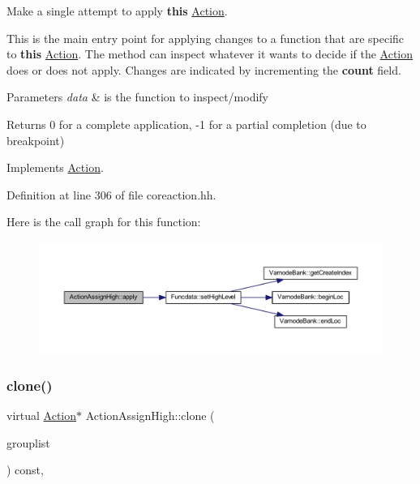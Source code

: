 Make a single attempt to apply {\bfseries{this}} \mbox{\hyperlink{class_action}{Action}}. 

This is the main entry point for applying changes to a function that are specific to {\bfseries{this}} \mbox{\hyperlink{class_action}{Action}}. The method can inspect whatever it wants to decide if the \mbox{\hyperlink{class_action}{Action}} does or does not apply. Changes are indicated by incrementing the {\bfseries{count}} field. 
\begin{DoxyParams}{Parameters}
{\em data} & is the function to inspect/modify \\
\hline
\end{DoxyParams}
\begin{DoxyReturn}{Returns}
0 for a complete application, -\/1 for a partial completion (due to breakpoint) 
\end{DoxyReturn}


Implements \mbox{\hyperlink{class_action_aac1c3999d6c685b15f5d9765a4d04173}{Action}}.



Definition at line 306 of file coreaction.\+hh.

Here is the call graph for this function\+:
\nopagebreak
\begin{figure}[H]
\begin{center}
\leavevmode
\includegraphics[width=350pt]{class_action_assign_high_aa0e3cd08123d3a5b60f0f0c35468b5ae_cgraph}
\end{center}
\end{figure}
\mbox{\label{class_action_assign_high_aeb37b16d8fa8f7393f39c7d2c38b8da9}} 
\subsubsection{\texorpdfstring{clone()}{clone()}}
{\footnotesize\ttfamily virtual \mbox{\hyperlink{class_action}{Action}}$\ast$ Action\+Assign\+High\+::clone (\begin{DoxyParamCaption}\item[{const \mbox{\hyperlink{class_action_group_list}{Action\+Group\+List}} \&}]{grouplist }\end{DoxyParamCaption}) const\hspace{0.3cm}{\ttfamily [inline]}, {\ttfamily [virtual]}}



